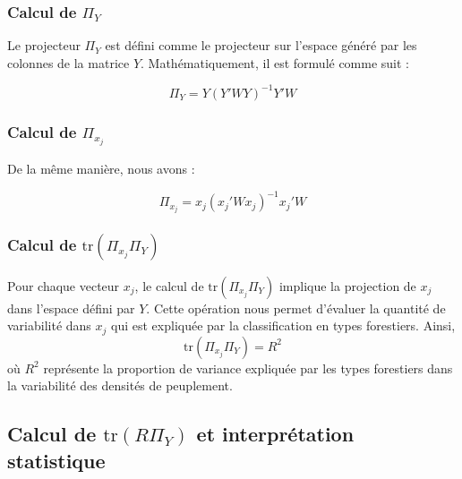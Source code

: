 \documentclass[
]{article}
\begin{document}
\hypertarget{calcul-de-pi_y}{%
\subsubsection{\texorpdfstring{Calcul de
\(\Pi_Y\)}{Calcul de \textbackslash Pi\_Y}}\label{calcul-de-pi_y}}

Le projecteur \(\Pi_Y\) est défini comme le projecteur sur l'espace
généré par les colonnes de la matrice \(Y\). Mathématiquement, il est
formulé comme suit :

\[
   \Pi_Y = Y \left( Y' W Y \right)^{-1} Y' W
   \]

\hypertarget{calcul-de-pi_x_j}{%
\subsubsection{\texorpdfstring{Calcul de
\(\Pi_{x_j}\)}{Calcul de \textbackslash Pi\_\{x\_j\}}}\label{calcul-de-pi_x_j}}

De la même manière, nous avons :

\[
   \Pi_{x_j} = {x_j} \left( {x_j}' W {x_j} \right)^{-1} {x_j}' W
   \]

\hypertarget{calcul-de-texttrpi_x_j-pi_y}{%
\subsubsection{\texorpdfstring{Calcul de
\(\text{tr}(\Pi_{x_j} \Pi_Y)\)}{Calcul de \textbackslash text\{tr\}(\textbackslash Pi\_\{x\_j\} \textbackslash Pi\_Y)}}\label{calcul-de-texttrpi_x_j-pi_y}}

Pour chaque vecteur \(x_j\), le calcul de \(\text{tr}(\Pi_{x_j} \Pi_Y)\)
implique la projection de \(x_j\) dans l'espace défini par \(Y\). Cette
opération nous permet d'évaluer la quantité de variabilité dans \(x_j\)
qui est expliquée par la classification en types forestiers.
Ainsi,\[ \text{tr}(\Pi_{x_j} \Pi_Y) = R^2 \] où \(R^2\) représente la
proportion de variance expliquée par les types forestiers dans la
variabilité des densités de peuplement.

\hypertarget{calcul-de-texttrr-pi_y-et-interpruxe9tation-statistique}{%
\subsection{\texorpdfstring{Calcul de \(\text{tr}(R \Pi_Y)\) et
interprétation
statistique}{Calcul de \textbackslash text\{tr\}(R \textbackslash Pi\_Y) et interprétation statistique}}\label{calcul-de-texttrr-pi_y-et-interpruxe9tation-statistique}}
\end{document}
